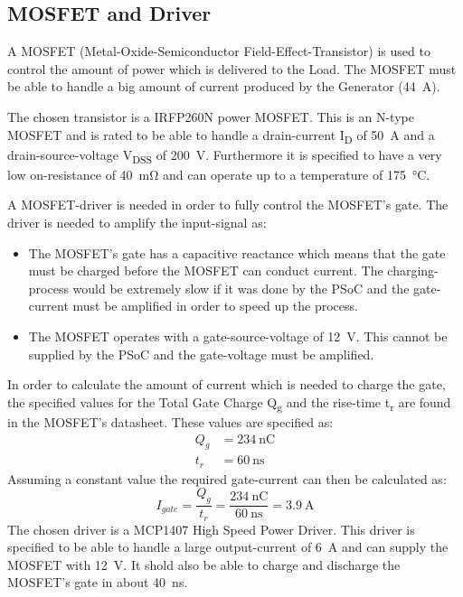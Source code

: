 \subsection{MOSFET and Driver}
A MOSFET (Metal-Oxide-Semiconductor Field-Effect-Transistor) is used to control the amount of power which is delivered to the Load. The MOSFET must be able to handle a big amount of current produced by the Generator (\SI{44}{\ampere}).

The chosen transistor is a IRFP260N power MOSFET. This is an N-type MOSFET\cite{IRFP260N} and is rated to be able to handle a drain-current I\textsubscript{D} of \SI{50}{\ampere} and a drain-source-voltage V\textsubscript{DSS} of \SI{200}{\volt}. Furthermore it is specified to have a very low on-resistance of \SI{40}{\milli \ohm} and can operate up to a temperature of \SI{175}{\celsius}.

A MOSFET-driver is needed in order to fully control the MOSFET's gate. The driver is needed to amplify the input-signal as:
\begin{itemize}
	\item The MOSFET's gate has a capacitive reactance which means that the gate must be charged before the MOSFET can conduct current. The charging-process would be extremely slow if it was done by the PSoC and the gate-current must be amplified in order to speed up the process.
	\item The MOSFET operates with a gate-source-voltage of \SI{12}{\volt}. This cannot be supplied by the PSoC and the gate-voltage must be amplified. 
\end{itemize}

In order to calculate the amount of current which is needed to charge the gate, the specified values for the Total Gate Charge Q\textsubscript{g} and the rise-time t\textsubscript{r} are found in the MOSFET's datasheet. These values are specified as:
\begin{equation}
\begin{split}
	Q_g &= \SI{234}{\nano \coulomb}\\
	t_r &= \SI{60}{\nano \second}
\end{split}
\end{equation}
Assuming a constant value the required gate-current can then be calculated as:
\begin{equation}
	I_{gate} = \frac{Q_g}{t_r} = \frac{\SI{234}{\nano \coulomb}}{\SI{60}{\nano \second}} = \SI{3.9}{\ampere}
\end{equation}
The chosen driver is a MCP1407 High Speed Power Driver\cite{MCP1407}. This driver is specified to be able to handle a large output-current of \SI{6}{\ampere} and can supply the MOSFET with \SI{12}{\volt}. It shold also be able to charge and discharge the MOSFET's gate in about \SI{40}{\nano \second}.

